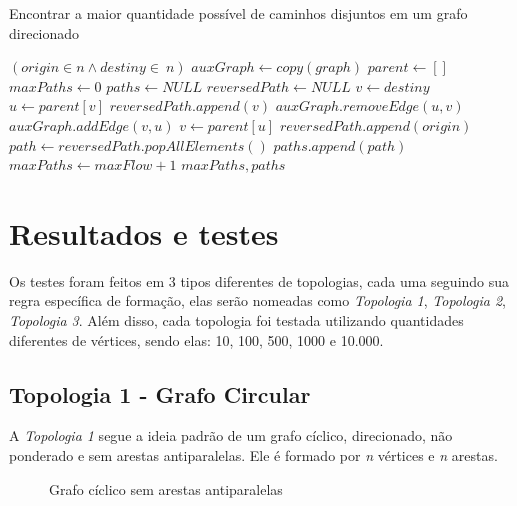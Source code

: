 \begin{algorithm}[H]
\caption{Encontrar a maior quantidade possível de caminhos disjuntos em um grafo direcionado}
\begin{algorithmic}[1]
\REQUIRE $(origin \in n \land destiny \in\ n)$
\STATE $auxGraph \leftarrow copy(graph)$
\STATE $parent \leftarrow [ ]$
\STATE $maxPaths \leftarrow 0$
\STATE $paths \leftarrow NULL$
    \STATE $reversedPath \leftarrow NULL$
    \STATE $v \leftarrow destiny$
        \STATE $u \leftarrow parent[v]$
        \STATE $reversedPath.append(v)$
        \STATE $auxGraph.removeEdge(u, v)$
        \STATE $auxGraph.addEdge(v, u)$
        \STATE $v \leftarrow parent[u]$
    \ENDWHILE
    \STATE $reversedPath.append(origin)$
    \STATE $path \leftarrow reversedPath.popAllElements()$
    \STATE $paths.append(path)$
    \STATE $maxPaths \leftarrow maxFlow + 1$
\ENDWHILE
\RETURN $maxPaths, paths$
\end{algorithmic}
\end{algorithm}

\section{Resultados e testes}
\label{sec:results}

Os testes foram feitos em 3 tipos diferentes de topologias, cada uma seguindo sua regra específica de formação, elas serão nomeadas como \emph{Topologia 1}, \emph{Topologia 2}, \emph{Topologia 3}. Além disso, cada topologia foi testada utilizando quantidades diferentes de vértices, sendo elas: 10, 100, 500, 1000 e 10.000.

\subsection{Topologia 1 - Grafo Circular}

A \emph{Topologia 1} segue a ideia padrão de um grafo cíclico, direcionado, não ponderado e sem arestas antiparalelas. Ele é formado por \emph{n} vértices e \emph{n} arestas.

\begin{figure}[hbt!]
    \centering
    \caption{Grafo cíclico sem arestas antiparalelas}
    \label{fig:my_label}
\end{figure}

